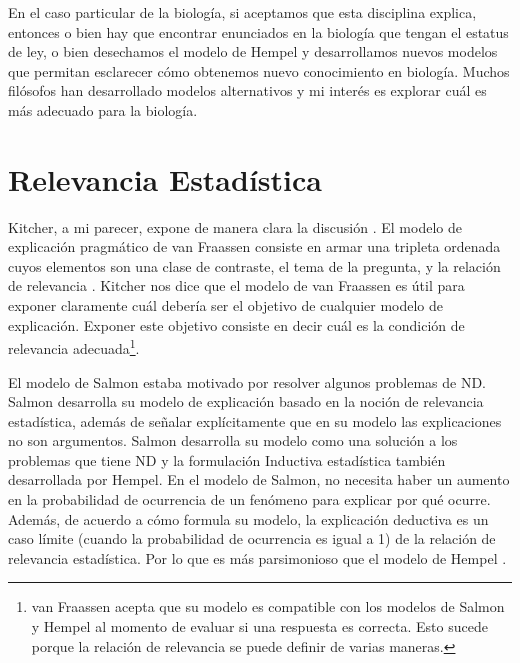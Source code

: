 En el caso particular de la biología, si aceptamos que esta disciplina explica, entonces o bien hay que encontrar enunciados en la biología que tengan el estatus de ley, o bien  desechamos el modelo de Hempel y desarrollamos nuevos modelos que permitan esclarecer cómo obtenemos nuevo conocimiento en biología. Muchos filósofos han desarrollado modelos alternativos y mi interés es explorar cuál es más adecuado para la biología.


\section{Relevancia Estadística}

\noindent Kitcher, a mi parecer, expone de manera clara la discusión \cite{Kitcher2002}. El modelo de explicación pragmático de van Fraassen consiste en armar una tripleta ordenada cuyos elementos son una clase de contraste, el tema de la pregunta, y la relación de relevancia \cite{Fraassen1977}. Kitcher nos dice que el modelo de van Fraassen es útil para exponer claramente cuál debería ser el objetivo de cualquier modelo de explicación. Exponer este objetivo consiste en decir cuál es la condición de relevancia adecuada\footnote{van Fraassen acepta que su modelo es compatible con los modelos de Salmon y Hempel al momento de evaluar si una respuesta es correcta. Esto sucede porque la relación de relevancia se puede definir de varias maneras\cite{Fraassen}.}.

El modelo de Salmon estaba motivado por resolver algunos problemas de ND. Salmon desarrolla su modelo de explicación basado en la noción de relevancia estadística, además de señalar explícitamente que en su modelo las explicaciones no son argumentos. Salmon desarrolla su modelo como una solución a los problemas que tiene ND y la formulación Inductiva estadística también desarrollada por Hempel. En el modelo de Salmon, no necesita haber un aumento en la probabilidad de ocurrencia de un fenómeno para explicar por qué ocurre. Además, de acuerdo a cómo formula su modelo, la explicación deductiva es un caso límite (cuando la probabilidad de ocurrencia es igual a 1) de la relación de relevancia estadística. Por lo que es más parsimonioso que el modelo de Hempel \cite{Salmon1970}.

